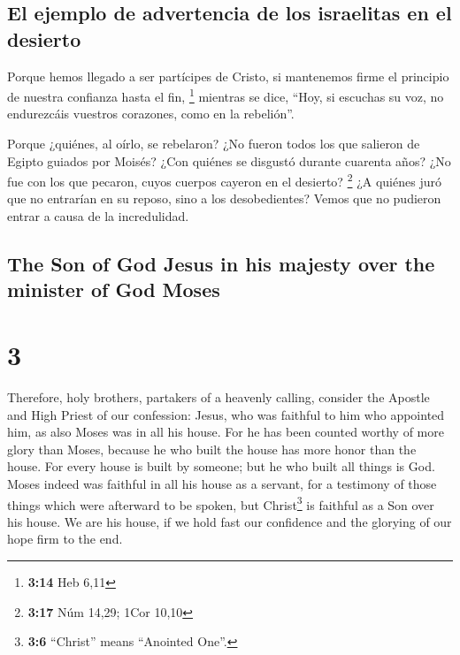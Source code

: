 \begin{paracol}{2}
\hypertarget{el-ejemplo-de-advertencia-de-los-israelitas-en-el-desierto}{%
\subsection{El ejemplo de advertencia de los israelitas en el
desierto}\label{el-ejemplo-de-advertencia-de-los-israelitas-en-el-desierto}}

 Porque hemos llegado a ser partícipes de Cristo, si
mantenemos firme el principio de nuestra confianza hasta el fin,
\footnote{\textbf{3:14} Heb 6,11}  mientras se dice,
``Hoy, si escuchas su voz, no endurezcáis vuestros corazones, como en la
rebelión''.

 Porque ¿quiénes, al oírlo, se rebelaron? ¿No fueron
todos los que salieron de Egipto guiados por Moisés? 
¿Con quiénes se disgustó durante cuarenta años? ¿No fue con los que
pecaron, cuyos cuerpos cayeron en el desierto? \footnote{\textbf{3:17}
  Núm 14,29; 1Cor 10,10}  ¿A quiénes juró que no
entrarían en su reposo, sino a los desobedientes?  Vemos
que no pudieron entrar a causa de la incredulidad.

\switchcolumn
\begin{otherlanguage}{english}

\hypertarget{the-son-of-god-jesus-in-his-majesty-over-the-minister-of-god-moses}{%
\subsection{The Son of God Jesus in his majesty over the minister of God
Moses}\label{the-son-of-god-jesus-in-his-majesty-over-the-minister-of-god-moses}}

\hypertarget{section-5}{%
\section{3}\label{section-5}}

 Therefore, holy brothers, partakers of a heavenly
calling, consider the Apostle and High Priest of our confession: Jesus,
 who was faithful to him who appointed him, as also Moses
was in all his house.  For he has been counted worthy of
more glory than Moses, because he who built the house has more honor
than the house.  For every house is built by someone; but
he who built all things is God.  Moses indeed was faithful
in all his house as a servant, for a testimony of those things which
were afterward to be spoken,  but Christ\footnote{\textbf{3:6}
  ``Christ'' means ``Anointed One''.} is faithful as a Son over his
house. We are his house, if we hold fast our confidence and the glorying
of our hope firm to the end.


\end{otherlanguage}
\end{paracol}

